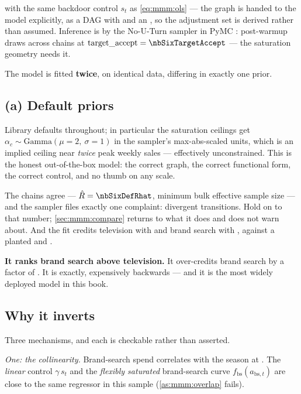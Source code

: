 with the same backdoor control $s_t$ as \cref{eq:mmm:ols} --- the graph is handed to the model
explicitly, as a DAG with  and an , so the adjustment
set is derived rather than assumed. Inference is by the No-U-Turn sampler \citep{hoffman2014} in
PyMC \citep{salvatier2016}: \nbSixNDraws{} post-warmup draws across \nbSixNChains{} chains at
$\text{target\_accept} = \nbSixTargetAccept$ --- the saturation geometry needs it.

The model is fitted \textbf{twice}, on identical data, differing in exactly one prior.

\subsection*{(a) Default priors}

Library defaults throughout; in particular the saturation ceilings get
$\alpha_c \sim \text{Gamma}(\mu = 2,\ \sigma = 1)$ in the sampler's max-abs-scaled units, which is
an implied ceiling near \emph{twice} peak weekly sales --- effectively unconstrained. This is the
honest out-of-the-box model: the correct graph, the correct functional form, the correct control,
and no thumb on any scale.

The chains agree --- $\hat R = \nbSixDefRhat$, minimum bulk effective sample size \nbSixDefEss{}
\citep{vehtari2021} --- and the sampler files exactly one complaint: \nbSixDefDiv{} divergent
transitions. Hold on to that number; \cref{sec:mmm:compare} returns to what it does and does not
warn about. And the fit credits television with \eur{\nbSixDefTv} and brand search with
\eur{\nbSixDefBs}, against a planted \eur{\nbSixTrueTv} and \eur{\nbSixTrueBs}.

\textbf{It ranks brand search above television.} It over-credits brand search by a factor of
\nbSixDefBsOverTrue. It is exactly, expensively backwards --- and it is the most widely deployed
model in this book.

\subsection*{Why it inverts}

Three mechanisms, and each is checkable rather than asserted.

\emph{One: the collinearity.} Brand-search spend correlates with the season at \nbSixCorrBsSeason.
The \emph{linear} control $\gamma\,s_t$ and the \emph{flexibly saturated} brand-search curve
$f_{\text{bs}}(a_{\text{bs},t})$ are close to the same regressor in this sample
(\cref{as:mmm:overlap} fails).

